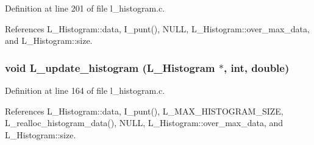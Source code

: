 Definition at line 201 of file l\_\-histogram.c.

References L\_\-Histogram::data, I\_\-punt(), NULL, L\_\-Histogram::over\_\-max\_\-data, and L\_\-Histogram::size.
\subsubsection{\setlength{\rightskip}{0pt plus 5cm}void L\_\-update\_\-histogram (\bf{L\_\-Histogram} $\ast$, int, double)}\label{l__histogram_8h_0c3ee32c430eab8a3bcbbe74a258b083}




Definition at line 164 of file l\_\-histogram.c.

References L\_\-Histogram::data, I\_\-punt(), L\_\-MAX\_\-HISTOGRAM\_\-SIZE, L\_\-realloc\_\-histogram\_\-data(), NULL, L\_\-Histogram::over\_\-max\_\-data, and L\_\-Histogram::size.